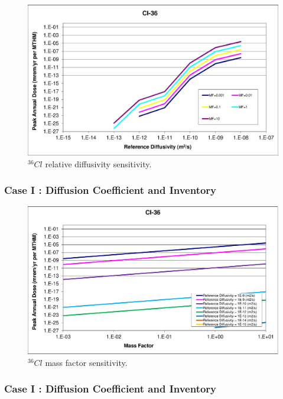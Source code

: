 \begin{frame}[c]
\begin{frame}[c]
\begin{figure}[ht]
\centering
\includegraphics[width=\linewidth]{DiffCoeffAndInvEBSFail/Cl-36.eps}
\caption{$^{36}Cl$ relative diffusivity sensitivity.}
\label{fig:DCInvCl36}
\end{figure}
\end{frame}

\begin{frame}[c]
  \frametitle{Case I : Diffusion Coefficient and Inventory}

\begin{figure}[ht]
\centering
\includegraphics[width=\linewidth]{DiffCoeffAndInvEBSFail/Cl-36-MF.eps}
\caption{$^{36}Cl$ mass factor sensitivity.}
\label{fig:DCInvCl36MF}
\end{figure}
\end{frame}


\begin{frame}[c]
  \frametitle{Case I : Diffusion Coefficient and Inventory}


\end{frame}
\end{frame}
